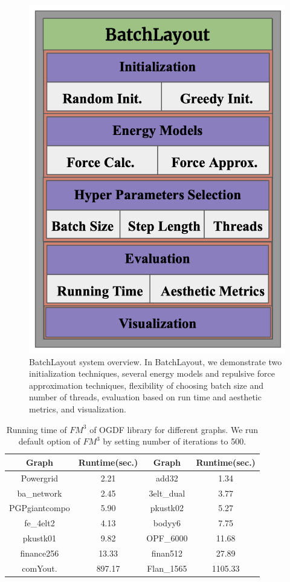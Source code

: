 \documentclass[conference]{article}
\begin{document}
\begin{figure}
    \centering
    \includegraphics[width=0.3\linewidth]{figures/batchlayoutsystem.png}
    \caption{BatchLayout system overview. In BatchLayout, we demonstrate two initialization techniques, several energy models and repulsive force approximation techniques, flexibility of choosing batch size and number of threads, evaluation based on run time and aesthetic metrics, and visualization.}
    \label{fig:blsystem}
\end{figure}


\begin{table}[t]
\caption{Running time of $FM^3$ of OGDF library for different graphs. We run default option of $FM^3$ by setting number of iterations to 500.}

\centering
\begin{tabular}{|c|c|c|c|}
\hline
\textbf{Graph} & \textbf{Runtime(sec.)} & \textbf{Graph} & \textbf{Runtime(sec.)} \\ \hline

Powergrid &	2.21	 &	add32 &	1.34	\\ \hline
ba\_network  &	2.45 &	3elt\_dual & 3.77 \\ \hline	PGPgiantcompo &	5.90 & pkustk02 &	5.27 \\ \hline
fe\_4elt2 &	4.13	&		bodyy6 &	7.75 \\ \hline	pkustk01 &		9.82 &	OPF\_6000 &		11.68 \\ \hline finance256  & 13.33 &		finan512 & 27.89\\ \hline
comYout.  & 897.17 &		Flan\_1565 & 1105.33\\ \hline
\end{tabular}
\label{tab:measures_fm3_time}
\end{table}
\end{document}

